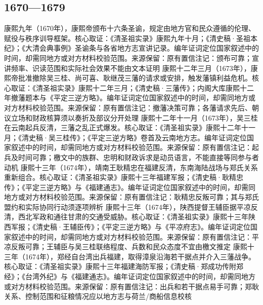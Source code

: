 \subsection{1670—1679}
康熙九年（1670年），康熙帝颁布十六条圣谕，规定由地方官和民众遵循的伦理、赋役与秩序训导框架。核心取证：《清圣祖实录》康熙九年十月；《清史稿·圣祖本纪》；《大清会典事例》圣谕条与各省地方志宣讲记录。编年证词定位国家叙述中的时间，却需同地方或对方材料校验范围。来源保留：原有置信注记：颁布可靠；宣讲频率、识读范围和实际社会效果不能由文本证明
康熙十二年三月（1673年），康熙帝批准撤除吴三桂、尚可喜、耿继茂三藩的请求或安排，触发藩镇利益危机。核心取证：《清圣祖实录》康熙十二年三月；《清史稿·三藩传》；内阁大库康熙十二年撤藩题本与《平定三逆方略》。编年证词定位国家叙述中的时间，却需同地方或对方材料校验范围。来源保留：原有置信注记：撤藩决策可靠；各藩请求先后、朝议立场和财政核算须以奏折及部议分开处理
康熙十二年十一月（1673年），吴三桂在云南起兵反清，三藩之乱正式爆发。核心取证：《清圣祖实录》康熙十二年十一月；《清史稿·吴三桂传》；《平定三逆方略》卷首及云南地方志。编年证词定位国家叙述中的时间，却需同地方或对方材料校验范围。来源保留：原有置信注记：起兵及时间可靠；檄文中的族群、忠明和财政诉求是动员语言，不能直接等同参与者动机
康熙十三年（1674年），靖南王耿精忠在福建反清，东南海陆战场与郑氏关系重新组合。核心取证：《清圣祖实录》康熙十三年福建军报；《清史稿·耿精忠传》；《平定三逆方略》与《福建通志》。编年证词定位国家叙述中的时间，却需同地方或对方材料校验范围。来源保留：原有置信注记：耿精忠反叛可靠；其与郑氏盟约和实际协同行动须逐项辨析
康熙十三年（1674年），陕西提督王辅臣据平凉反清，西北军政和通往甘肃的交通受威胁。核心取证：《清圣祖实录》康熙十三年陕西军报；《清史稿·王辅臣传》；《平定三逆方略》与《平凉府志》。编年证词定位国家叙述中的时间，却需同地方或对方材料校验范围。来源保留：原有置信注记：平凉反叛可靠；王辅臣与吴三桂联络程度、兵数和民众态度不宜由檄文推定
康熙十三年（1674年），郑经自台湾出兵福建，取得漳泉沿海若干据点并介入三藩战争。核心取证：《清圣祖实录》康熙十三年福建海防军报；《清史稿·郑成功传附郑经》；《台湾外纪》与《福建通志》。编年证词定位国家叙述中的时间，却需同地方或对方材料校验范围。来源保留：原有置信注记：出兵和若干据点易手可靠；郑耿关系、控制范围和征粮情况应以地方志与荷兰/商船信息校核
